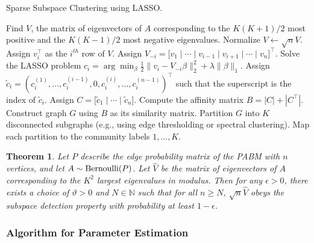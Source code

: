 \documentclass[
  11pt,
]{article}
\newtheorem{theorem}{Theorem}[section]
\theoremstyle{definition}
\theoremstyle{definition}
\theoremstyle{definition}
\theoremstyle{definition}
\theoremstyle{remark}
\begin{document}
\begin{algorithm}[t]
  \label{alg:ssc}
  \DontPrintSemicolon
  \SetAlgoLined
  \caption{Sparse Subspace Clustering using LASSO.}
    Find $V$, the matrix of eigenvectors of $A$
    corresponding to the $K (K + 1) / 2$ most positive
    and the $K (K - 1) / 2$ most negative eigenvalues.\;
    Normalize $V \leftarrow \sqrt{n} V$.\;
     {
      Assign $v_i^\top$ as the $i^{th}$ row of $V$.
      Assign $V_{-i} = \bigl[
      v_1 \mid \cdots \mid v_{i-1} \mid v_{i+1} \mid \cdots \mid v_n \bigr]^\top$.\;
      Solve the LASSO problem
      $c_i = \arg\min_{\beta}
      \frac{1}{2} \|v_i - V_{-i} \beta\|_2^2 + \lambda \|\beta\|_1$.\;
      Assign $\tilde{c}_i = (c_i^{(1)}, \dots, c_i^{(i-1)}, 0, c_i^{(i)}, \dots, c_i^{(n-1)})^\top$ such that the superscript is the index of
      $\tilde{c}_i$.\;
    }
    Assign
    $C = \bigr[ \tilde{c}_1 \mid \cdots \mid \tilde{c}_n \bigr]$.\;
    Compute the affinity matrix $B = |C| + |C^\top|$.\;
    Construct graph $G$ using $B$ as its similarity matrix.\;
    Partition $G$ into $K$ disconnected subgraphs (e.g., using edge
    thresholding or spectral clustering).\;
    Map each partition to the community labels $1, ..., K$.
\end{algorithm}

\begin{theorem}
\label{thm:ssc}
Let $P$ describe the edge probability matrix of the PABM with $n$ vertices, and let $A \sim \mathrm{Bernoulli}(P)$. 
Let $\hat{V}$ be the matrix of eigenvectors of $A$ corresponding to the $K^2$ largest eigenvalues in modulus. 
Then for any $\epsilon > 0$, there exists a choice of $\vartheta > 0$ and $N \in \mathbb{N}$ such that for all $n \geq N$, $\sqrt{n} \hat{V}$ obeys the subspace detection property with probability at least $1 - \epsilon$.  
\end{theorem}

\hypertarget{algorithm-for-parameter-estimation}{%
\subsubsection{Algorithm for Parameter Estimation}\label{algorithm-for-parameter-estimation}}
\end{document}
